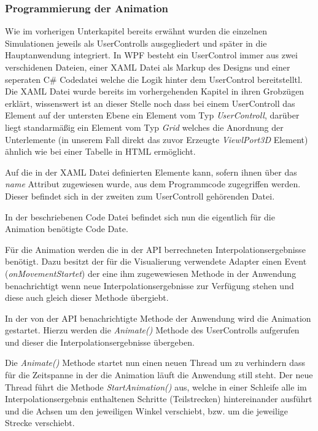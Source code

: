 \subsubsection{Programmierung der Animation}
Wie im vorherigen Unterkapitel bereits erwähnt wurden die einzelnen Simulationen jeweils als UserControlls ausgegliedert und später in die Hauptanwendung integriert. 
In WPF besteht ein UserControl immer aus zwei verschidenen Dateien, einer XAML Datei als Markup des Designs und einer seperaten C\# Codedatei welche die Logik hinter dem UserControl bereitstelltl. Die XAML Datei wurde bereits im vorhergehenden Kapitel in ihren Grobzügen erklärt, wissenswert ist an dieser Stelle noch dass bei einem UserControll das Element auf der untersten Ebene ein Element vom Typ \textit{UserControll}, darüber liegt standarmäßig ein Element vom Typ \textit{Grid} welches die Anordnung der Unterlemente (in unserem Fall direkt das zuvor Erzeugte \textit{ViewlPort3D} Element) ähnlich wie bei einer Tabelle in HTML ermöglicht.

Auf die in der XAML Datei definierten Elemente kann, sofern ihnen über das \textit{name} Attribut zugewiesen wurde, aus dem Programmcode zugegriffen werden. Dieser befindet sich in der zweiten zum UserControll gehörenden Datei.

In der beschriebenen Code Datei befindet sich nun die eigentlich für die Animation benötigte Code Date. 

Für die Animation werden die in der API berrechneten Interpolationsergebnisse benötigt. Dazu besitzt der für die Visualierung verwendete Adapter einen Event (\textit{onMovementStartet}) der eine ihm zugewewiesen Methode in der Anwendung benachrichtigt wenn neue Interpolationsergebnisse zur Verfügung stehen und diese auch gleich dieser Methode übergiebt. 

In der von der API benachrichtigte Methode der Anwendung wird die Animation gestartet. Hierzu werden die \textit{Animate()} Methode des UserControlls aufgerufen und dieser die Interpolationsergebnisse übergeben.

Die \textit{Animate()} Methode startet nun einen neuen Thread um zu verhindern dass für die Zeitspanne in der die Animation läuft die Anwendung still steht. Der neue Thread führt die Methode \textit{StartAnimation()} aus, welche in einer Schleife alle im Interpolationsergebnis enthaltenen Schritte (Teilstrecken) hintereinander ausführt und die Achsen um den jeweiligen Winkel verschiebt, bzw. um die jeweilige Strecke verschiebt. 

